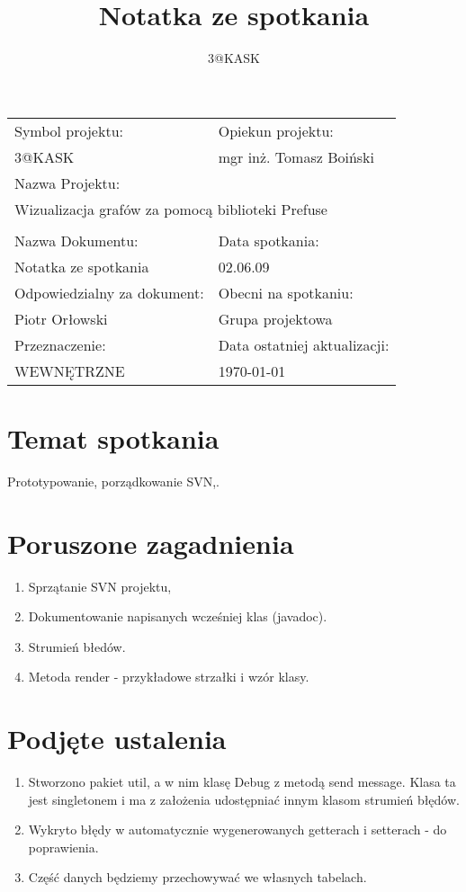\documentclass[a4paper,10pt]{article}
\title{Notatka ze spotkania}
\author{3@KASK}
\begin{document}



\maketitle


\begin{center}
\begin{tabular}{|p{7cm}|p{7cm}|}
\hline
Symbol projektu: & Opiekun projektu:   \tabularnewline
3@KASK & mgr inż. Tomasz Boiński    \tabularnewline \hline
\multicolumn{2}{|l|}{Nazwa Projektu: } \tabularnewline
\multicolumn{2}{|l|}{Wizualizacja grafów za pomocą biblioteki Prefuse } \tabularnewline
\hline
\multicolumn{2}{l}{ } \tabularnewline %
\hline
Nazwa Dokumentu: & Data spotkania:   \tabularnewline
Notatka ze spotkania & 02.06.09 \tabularnewline \hline
Odpowiedzialny za dokument: & Obecni na spotkaniu:   \tabularnewline
Piotr Orłowski & Grupa projektowa \tabularnewline \hline
Przeznaczenie: & Data ostatniej aktualizacji:   \tabularnewline
WEWNĘTRZNE & \today \tabularnewline \hline
\end{tabular}
\end{center}



\section{Temat spotkania}
Prototypowanie, porządkowanie SVN,.

\section{Poruszone zagadnienia}
\begin{enumerate}
\item Sprzątanie SVN projektu,
\item Dokumentowanie napisanych wcześniej klas (javadoc).
\item Strumień błedów.
\item Metoda render - przykładowe strzałki i wzór klasy.
\end{enumerate}


\section{Podjęte ustalenia}
\begin{enumerate}
\item Stworzono pakiet util, a w nim klasę Debug z metodą send message. Klasa ta jest singletonem i ma z założenia udostępniać innym klasom strumień błędów.
\item Wykryto błędy w automatycznie wygenerowanych getterach i setterach - do poprawienia.
\item Część danych będziemy przechowywać we własnych tabelach.
\end{enumerate}



%
\end{document}
